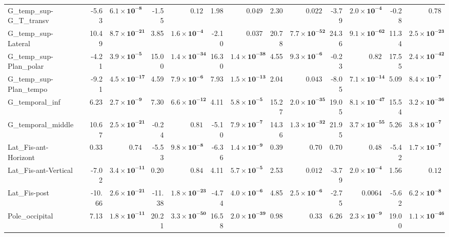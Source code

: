 {\begin{longtable}{llrrrrrrrrrrrr}
G\_temp\_sup-G\_T\_transv &  & -5.63 & $\mathbf{6.1{\times}10^{-8}}$ & -1.55 & $0.12$ & 1.98 & $0.049$ & 2.30 & $0.022$ & -3.79 & $\mathbf{2.0{\times}10^{-4}}$ & -0.28 & $0.78$ \\
G\_temp\_sup-Lateral &  & 10.49 & $\mathbf{8.7{\times}10^{-21}}$ & 3.85 & $\mathbf{1.6{\times}10^{-4}}$ & -2.10 & $0.037$ & 20.78 & $\mathbf{7.7{\times}10^{-52}}$ & 24.36 & $\mathbf{9.1{\times}10^{-62}}$ & 11.34 & $\mathbf{2.5{\times}10^{-23}}$ \\
G\_temp\_sup-Plan\_polar &  & -4.21 & $\mathbf{3.9{\times}10^{-5}}$ & 15.00 & $\mathbf{1.4{\times}10^{-34}}$ & 16.30 & $\mathbf{1.4{\times}10^{-38}}$ & 4.55 & $\mathbf{9.3{\times}10^{-6}}$ & -0.23 & $0.82$ & 17.55 & $\mathbf{2.4{\times}10^{-42}}$ \\
G\_temp\_sup-Plan\_tempo &  & -9.21 & $\mathbf{4.5{\times}10^{-17}}$ & 4.59 & $\mathbf{7.9{\times}10^{-6}}$ & 7.93 & $\mathbf{1.5{\times}10^{-13}}$ & 2.04 & $0.043$ & -8.05 & $\mathbf{7.1{\times}10^{-14}}$ & 5.09 & $\mathbf{8.4{\times}10^{-7}}$ \\
G\_temporal\_inf &  & 6.23 & $\mathbf{2.7{\times}10^{-9}}$ & 7.30 & $\mathbf{6.6{\times}10^{-12}}$ & 4.11 & $\mathbf{5.8{\times}10^{-5}}$ & 15.27 & $\mathbf{2.0{\times}10^{-35}}$ & 19.05 & $\mathbf{8.1{\times}10^{-47}}$ & 15.54 & $\mathbf{3.2{\times}10^{-36}}$ \\
G\_temporal\_middle &  & 10.67 & $\mathbf{2.5{\times}10^{-21}}$ & -0.24 & $0.81$ & -5.10 & $\mathbf{7.9{\times}10^{-7}}$ & 14.36 & $\mathbf{1.3{\times}10^{-32}}$ & 21.95 & $\mathbf{3.7{\times}10^{-55}}$ & 5.26 & $\mathbf{3.8{\times}10^{-7}}$ \\
Lat\_Fis-ant-Horizont &  & 0.33 & $0.74$ & -5.53 & $\mathbf{9.8{\times}10^{-8}}$ & -6.36 & $\mathbf{1.4{\times}10^{-9}}$ & 0.39 & $0.70$ & 0.70 & $0.48$ & -5.42 & $\mathbf{1.7{\times}10^{-7}}$ \\
Lat\_Fis-ant-Vertical &  & -7.02 & $\mathbf{3.4{\times}10^{-11}}$ & 0.20 & $0.84$ & 4.11 & $\mathbf{5.7{\times}10^{-5}}$ & 2.53 & $0.012$ & -3.79 & $\mathbf{2.0{\times}10^{-4}}$ & 1.56 & $0.12$ \\
Lat\_Fis-post &  & -10.66 & $\mathbf{2.6{\times}10^{-21}}$ & -11.38 & $\mathbf{1.8{\times}10^{-23}}$ & -4.74 & $\mathbf{4.0{\times}10^{-6}}$ & 4.85 & $\mathbf{2.5{\times}10^{-6}}$ & -2.75 & $0.0064$ & -5.62 & $\mathbf{6.2{\times}10^{-8}}$ \\
Pole\_occipital &  & 7.13 & $\mathbf{1.8{\times}10^{-11}}$ & 20.21 & $\mathbf{3.3{\times}10^{-50}}$ & 16.58 & $\mathbf{2.0{\times}10^{-39}}$ & 0.98 & $0.33$ & 6.26 & $\mathbf{2.3{\times}10^{-9}}$ & 19.00 & $\mathbf{1.1{\times}10^{-46}}$ \\

\end{longtable}}
